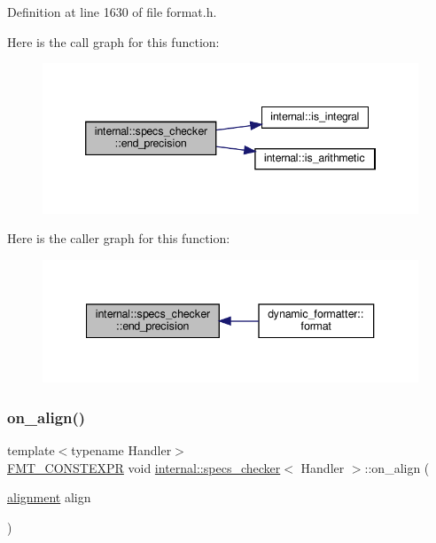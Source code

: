 Definition at line 1630 of file format.\+h.

Here is the call graph for this function\+:
\nopagebreak
\begin{figure}[H]
\begin{center}
\leavevmode
\includegraphics[width=346pt]{classinternal_1_1specs__checker_a0c16ee4bc2e70bb2c3e736e195dcd870_cgraph}
\end{center}
\end{figure}
Here is the caller graph for this function\+:
\nopagebreak
\begin{figure}[H]
\begin{center}
\leavevmode
\includegraphics[width=340pt]{classinternal_1_1specs__checker_a0c16ee4bc2e70bb2c3e736e195dcd870_icgraph}
\end{center}
\end{figure}
\mbox{\label{classinternal_1_1specs__checker_ab4c0aaf640c5bf31b031a6fd502213fb}} 
\subsubsection{\texorpdfstring{on\+\_\+align()}{on\_align()}}
{\footnotesize\ttfamily template$<$typename Handler$>$ \\
\hyperlink{core_8h_a69201cb276383873487bf68b4ef8b4cd}{F\+M\+T\+\_\+\+C\+O\+N\+S\+T\+E\+X\+PR} void \hyperlink{classinternal_1_1specs__checker}{internal\+::specs\+\_\+checker}$<$ Handler $>$\+::on\+\_\+align (\begin{DoxyParamCaption}\item[{\hyperlink{format_8h_a5460ac1c70db05be4ec2268f463ea981}{alignment}}]{align }\end{DoxyParamCaption})\hspace{0.3cm}{\ttfamily [inline]}}




